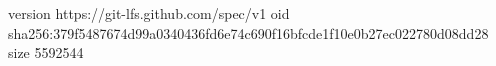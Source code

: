 version https://git-lfs.github.com/spec/v1
oid sha256:379f5487674d99a0340436fd6e74c690f16bfcde1f10e0b27ec022780d08dd28
size 5592544
